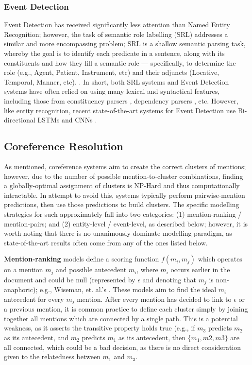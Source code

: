 \subsubsection{Event Detection}
Event Detection has received significantly less attention than Named Entity Recognition; however, the task of semantic role labelling (SRL) addresses a similar and more encompassing problem; SRL is a shallow semantic parsing task, whereby the goal is to identify each predicate in a sentence, along with its constituents and how they fill a semantic role --- specifically, to determine the role (e.g., Agent, Patient, Instrument, etc) and their adjuncts (Locative, Temporal, Manner, etc). \cite{Punyakanok:2008:ISP:1403157.1403162, Gildea:2002:ALS:643092.643093}.  In short, both SRL systems and Event Detection systems have often relied on using many lexical and syntactical features, including those from constituency parsers \cite{Toutanova:2005:JLI:1219840.1219913}, dependency parsers \cite{Johansson:2007:LSS:1621474.1621522}, etc.
However, like entity recognition, recent state-of-the-art systems for Event Detection use Bi-directional LSTMs and CNNs \cite{Feng2016ALN}.

\subsection{Coreference Resolution}
As mentioned, coreference systems aim to create the correct clusters of mentions; however, due to the number of possible mention-to-cluster combinations, finding a globally-optimal assignment of clusters is NP-Hard and thus computationally intractable.  In attempt to avoid this, systems typically perform pairwise-mention predictions, then use those predictions to build clusters. The specific modelling strategies for such approximately fall into two categories: (1) mention-ranking / mention-pairs; and (2) entity-level / event-level, as described below; however, it is worth noting that there is no unanimously-dominate modelling paradigm, as state-of-the-art results often come from any of the ones listed below.

\textbf{Mention-ranking} models define a scoring function $f(m_i,m_j)$ which operates on a mention $m_j$ and possible antecedent $m_i$, where $m_i$ occurs earlier in the document and could be null (represented by $\epsilon$ and denoting that $m_j$ is non-anaphoric); e.g., Wiseman, et. al.'s \cite{DBLP:conf/acl/WisemanRSW15}.  These models aim to find the ideal $m_i$ antecedent for every $m_j$ mention.  After every mention has decided to link to $\epsilon$ or a previous mention, it is common practice to define each cluster simply by joining together all mentions which are connected by a single path.  This is a potential weakness, as it asserts the transitive property holds true (e.g., if $m_3$ predicts $m_2$ as its antecedent, and $m_2$ predicts $m_1$ as its antecedent, then $\{m_1,m2,m3\}$ are all connected, which could be a bad decision, as there is no direct consideration given to the relatedness between $m_1$ and $m_3$.

